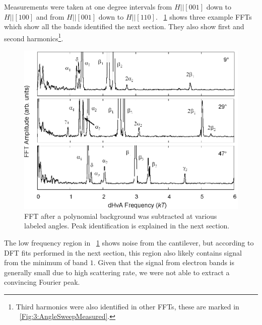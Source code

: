 Measurements were taken at one degree intervals from $H || [001]$ down to $H || [100]$ and from $H || [001]$ down to $H || [110]$. \Fig~\ref{Fig:3:FFTExamples} shows three example FFTs which show all the bands identified the next section. They also show first and second harmonics\footnote{Third harmonics were also identified in other FFTs, these are marked in \fig~\ref{Fig:3:AngleSweepMeasured}.}.
\begin{figure}[h!]
    \begin{center}
        \includegraphics[scale=0.7]{Chapter3-dHvABaFe2P2/Figures/AngleDepMeasurements/FFTExamples/FFTExamples}
        \caption{FFT after a polynomial background was subtracted at various labeled angles. Peak identification is explained in the next section.}
        \label{Fig:3:FFTExamples}
    \end{center}
\end{figure}

The low frequency region in \fig~\ref{Fig:3:FFTExamples} shows noise from the cantilever, but according to DFT fits performed in the next section, this region also likely contains signal from the minimum of band $1$. Given that the signal from electron bands is generally small due to high scattering rate, we were not able to extract a convincing Fourier peak.


